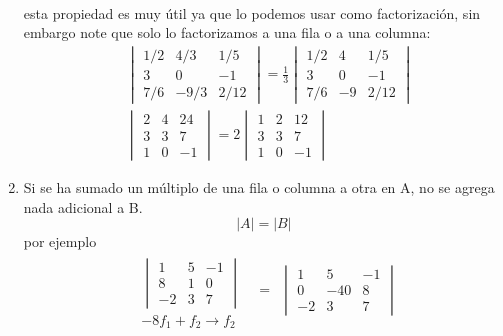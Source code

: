 \begin{enumerate}
\begin{align*}
	\end{align*}
	esta propiedad es muy útil ya que lo podemos usar como factorización, sin embargo note que solo lo factorizamos a una fila o a una columna:
	\begin{align*}
		&\begin{vmatrix}
			1/2&4/3&1/5\\
			3&0&-1\\
			7/6&-9/3&2/12
		\end{vmatrix}=\frac{1}{3}\begin{vmatrix}
		1/2&4&1/5\\
		3&0&-1\\
		7/6&-9&2/12
		\end{vmatrix}\\
		&\begin{vmatrix}
			2&4&24\\
			3&3&7\\
			1&0&-1
		\end{vmatrix}=2\begin{vmatrix}
			1&2&12\\
			3&3&7\\
			1&0&-1
		\end{vmatrix}
	\end{align*}
	\item Si se ha sumado un múltiplo de una fila o columna a otra en A, no se agrega nada adicional a B.
	$$ |A|=|B| $$
	por ejemplo
	\begin{align*}
		&\begin{array} {c}
			\begin{vmatrix}
				1&5&-1\\
				8&1&0\\
				-2&3&7
			\end{vmatrix} \ \\
			-8f_1+f_2\rightarrow f_2
		\end{array}\begin{matrix}
		= \ \ \begin{vmatrix}
			1&5&-1\\
			0&-40&8\\
			-2&3&7
		\end{vmatrix}\\
			\
		\end{matrix}
	\end{align*}
\end{enumerate}